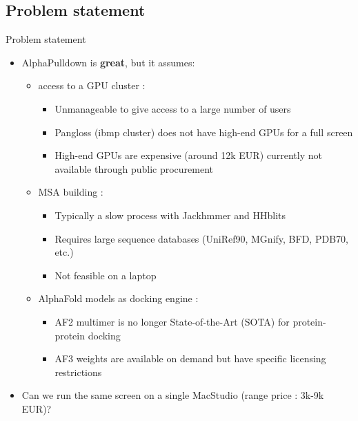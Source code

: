 \documentclass[aspectratio=169]{beamer}
\newcommand{\currentsubsectionname}{}
\let\origsubsection\subsection
\renewcommand{\subsection}[1]{\origsubsection{#1}\gdef\currentsubsectionname{#1}}
\begin{document}
\subsection{Problem statement}

\begin{frame}{Problem statement}
  \begin{itemize}
    \item AlphaPulldown is \textbf{great}, but it assumes:
      \begin{itemize}
        \item access to a GPU cluster : 
        \begin{itemize}
          \item Unmanageable to give access to a large number of users
          \item Pangloss (ibmp cluster) does not have high-end GPUs for a full screen
          \item High-end GPUs are expensive (around 12k EUR) currently not available through public procurement
        \end{itemize}
        \item MSA building :
        \begin{itemize}
          \item Typically a slow process with Jackhmmer and HHblits
          \item Requires large sequence databases (UniRef90, MGnify, BFD, PDB70, etc.)
          \item Not feasible on a laptop
        \end{itemize}
        \item AlphaFold models as docking engine :
        \begin{itemize}
          \item  AF2 multimer is no longer State-of-the-Art (SOTA) for protein-protein docking
          \item  AF3 weights are available on demand but have specific licensing restrictions
        \end{itemize}
      \end{itemize}
    \item[$\Rightarrow$] Can we run the same screen on a single MacStudio (range price : 3k-9k EUR)?
  \end{itemize}
\end{frame}

\end{document}
